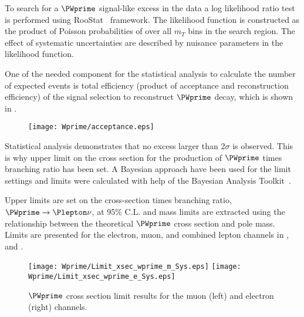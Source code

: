 To search for a $\PWprime$ signal-like excess in the data a log likelihood ratio test is performed using RooStat~\cite{RooStat_project} framework.
The likelihood function is constructed as the product of Poisson probabilities of over all $m_T$ bins in the search region.
The effect of systematic uncertainties are described by nuisance parameters in the likelihood function.

One of the needed component for the statistical analysis to calculate the number of expected events is total efficiency (product of acceptance and reconstruction efficiency) 
of the signal selection to reconstruct $\PWprime$ decay, which is shown in .


\begin{figure}[]
  \centering
  \texttt{[image: Wprime/acceptance.eps]}
  \caption{
  }
  \label{fig:AccEff_mu}
\end{figure}

Statistical analysis demonstrates that no excess larger than 2$\sigma$ is observed.
This is why upper limit on the cross section for the production of $\PWprime$ times branching ratio has been set. 
A Bayesian approach have been used for the limit settings and limits were calculated with help of the Bayesian Analysis Toolkit~\cite{BAT}.



Upper limits are set on the cross-section times branching ratio, $\PWprime \rightarrow \Plepton\nu$, at 95\% C.L. and mass 
limits are extracted using the relationship between the theoretical $\PWprime$ cross section and pole mass. Limits are presented for the electron, muon, 
and combined lepton channels in ,  and .


\begin{figure}[]
  \centering
\texttt{[image: Wprime/Limit\_xsec\_wprime\_m\_Sys.eps]}
\texttt{[image: Wprime/Limit\_xsec\_wprime\_e\_Sys.eps]}
\caption{$\PWprime$ cross section limit results for the muon (left) and electron (right) channels.}
\label{fig:wprime_limits}
\end{figure}



